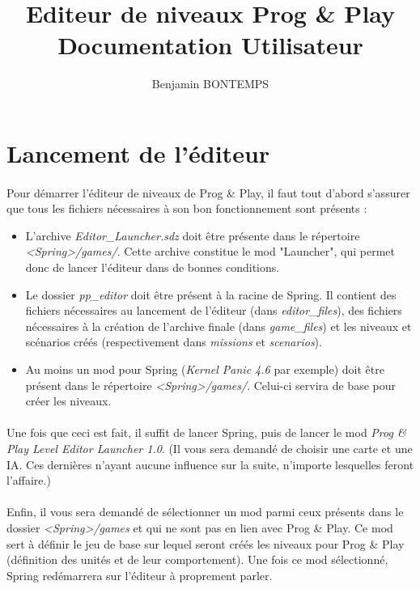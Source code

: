 \documentclass[a4paper]{article}
\title{Editeur de niveaux Prog \& Play\\ Documentation Utilisateur}
\author{Benjamin BONTEMPS}
\begin{document}
\maketitle

\tableofcontents

\newpage

\section{Lancement de l'éditeur}
\paragraph{ }
Pour démarrer l'éditeur de niveaux de Prog \& Play, il faut tout d'abord s'assurer que tous les fichiers nécessaires à son bon fonctionnement sont présents :
\begin{itemize}
\item L'archive \textit{Editor\_Launcher.sdz} doit être présente dans le répertoire \textit{<Spring>/games/}. Cette archive constitue le mod "Launcher", qui permet donc de lancer l'éditeur dans de bonnes conditions.
\item Le dossier \textit{pp\_editor} doit être présent à la racine de Spring. Il contient des fichiers nécessaires au lancement de l'éditeur (dans \textit{editor\_files}), des fichiers nécessaires à la création de l'archive finale (dans \textit{game\_files}) et les niveaux et scénarios créés (respectivement dans \textit{missions} et \textit{scenarios}).
\item Au moins un mod pour Spring (\textit{Kernel Panic 4.6} par exemple) doit être présent dans le répertoire \textit{<Spring>/games/}. Celui-ci servira de base pour créer les niveaux.
\end{itemize}
\paragraph{ }
Une fois que ceci est fait, il suffit de lancer Spring, puis de lancer le mod \textit{Prog \& Play Level Editor Launcher 1.0}. (Il vous sera demandé de choisir une carte et une IA. Ces dernières n'ayant aucune influence sur la suite, n'importe lesquelles feront l'affaire.)
\paragraph{ }
Enfin, il vous sera demandé de sélectionner un mod parmi ceux présents dans le dossier \textit{<Spring>/games} et qui ne sont pas en lien avec Prog \& Play. Ce mod sert à définir le jeu de base sur lequel seront créés les niveaux pour Prog \& Play (définition des unités et de leur comportement). Une fois ce mod sélectionné, Spring redémarrera sur l'éditeur à proprement parler.
\end{document}
